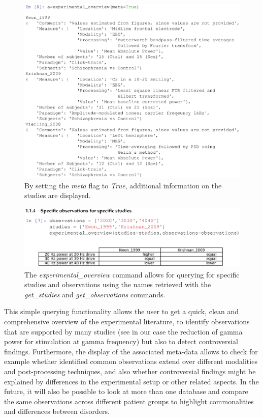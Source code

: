 \documentclass[CompPsych]{stjour}
\begin{document}
\begin{figure}
\includegraphics[width=\textwidth]{Figures/display_meta2}
\caption{ By setting the \textit{meta} flag to \textit{True}, additional information on the studies are displayed.}
\label{Fig:ExpOverview1}
\end{figure}

\begin{figure}
\includegraphics[width=\textwidth]{Figures/specific_studies_and_observations}
\caption{The \textit{experimental\_overview} command allows for querying for specific studies and observations using the names retrieved with the \textit{get\_studies} and \textit{get\_observations} commands.}
\label{Fig:ExpOverview2}
\end{figure}

This simple querying functionality allows the user to get a quick, clean and comprehensive overview of the experimental literature, to identify observations that are supported by many studies (see in our case the reduction of
gamma power for stimulation at gamma frequency) but also to detect controversial findings. Furthermore, the display of the associated meta-data allows to check for example whether identified common observations extend over
different modalities and post-processing techniques, and also whether controversial findings might be explained by differences in the experimental setup or other related aspects. In the future, it will also be possible 
to look at more than one database and compare the same observations across different patient groups to highlight commonalities and differences between disorders.
\end{document}
